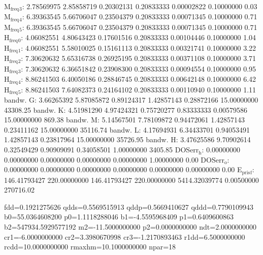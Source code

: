 \documentclass[11pt]{article}
\begin{document}
M\(_{\text{freq}}\)\(_{\text{3}}\):   2.78569975   2.85858719   0.20302131   0.20833333   0.00002822   0.10000000         0.03
M\(_{\text{freq}}\)\(_{\text{4}}\):   6.39363545   5.66706047   0.23504379   0.20833333   0.00071345   0.10000000         0.71
M\(_{\text{freq}}\)\(_{\text{5}}\):   6.39363545   5.66706047   0.23504379   0.20833333   0.00071345   0.10000000         0.71
H\(_{\text{freq}}\)\(_{\text{0}}\):   4.06082551   4.80643423   0.17601516   0.20833333   0.00104446   0.10000000         1.04
H\(_{\text{freq}}\)\(_{\text{1}}\):   4.06082551   5.58010025   0.15161113   0.20833333   0.00321741   0.10000000         3.22
H\(_{\text{freq}}\)\(_{\text{2}}\):   7.30620632   5.65316738   0.26925195   0.20833333   0.00371108   0.10000000         3.71
H\(_{\text{freq}}\)\(_{\text{3}}\):   7.30620632   6.36651842   0.23908300   0.20833333   0.00094554   0.10000000         0.95
H\(_{\text{freq}}\)\(_{\text{4}}\):   8.86241503   6.40050186   0.28846745   0.20833333   0.00642148   0.10000000         6.42
H\(_{\text{freq}}\)\(_{\text{5}}\):   8.86241503   7.64082373   0.24164102   0.20833333   0.00110940   0.10000000         1.11
bandw. G:   3.66265392   5.87085872   0.89124317   1.42857143   0.28872166  15.00000000     43308.25
bandw. K:   4.51981290   4.97424321   0.75720277   0.83333333   0.00579586  15.00000000       869.38
bandw. M:   5.14567501   7.78109872   0.94472061   1.42857143   0.23411162  15.00000000     35116.74
bandw. L:   4.17694931   6.34433701   0.94053491   1.42857143   0.23817964  15.00000000     35726.95
bandw. H:   3.47625586   9.70902614   0.32549429   0.90909091   0.34058501   1.00000000      3405.85
DOSerr\(_{\text{h}}\):   0.00000000   0.00000000   0.00000000   0.00000000   0.00000000   1.00000000         0.00
DOSerr\(_{\text{o}}\):   0.00000000   0.00000000   0.00000000   0.00000000   0.00000000   0.00000000         0.00
E\(_{\text{pris}}\)\(_{\text{f}}\): 146.41793427 220.00000000 146.41793427 220.00000000 5414.32039774   0.00500000    270716.02


fdd=0.1921275626 qdds=0.5569515913 qddp=0.5669410627 qddd=0.7790109943 b0=55.0364608200 p0=1.1118288046 b1=-4.5595968409 p1=0.6409600863 b2=547934.5929577192 m2=-11.5000000000 p2=0.0000000000 ndt=2.0000000000 cr1=-6.0000000000 cr2=3.3980670998 cr3=-1.2170893463 r1dd=6.5000000000 rcdd=10.0000000000 rmaxhm=10.1000000000 npar=18 
\end{document}
